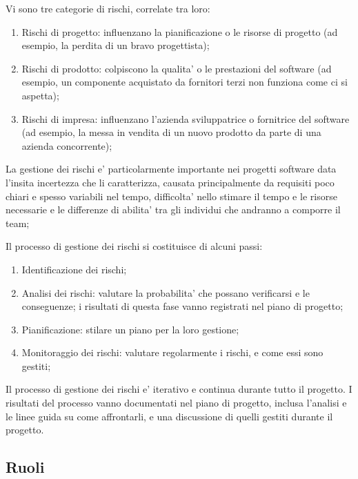 Vi sono tre categorie di rischi, correlate tra loro:

\begin{enumerate}
  \item Rischi di progetto: influenzano la pianificazione o le risorse di
    progetto (ad esempio, la perdita di un bravo progettista);
  \item Rischi di prodotto: colpiscono la qualita' o le prestazioni del software
    (ad esempio, un componente acquistato da fornitori terzi non funziona come
    ci si aspetta);
  \item Rischi di impresa: influenzano l'azienda sviluppatrice o fornitrice del
    software (ad esempio, la messa in vendita di un nuovo prodotto da parte
    di una azienda concorrente);
\end{enumerate}

La gestione dei rischi e' particolarmente importante nei progetti software data
l'insita incertezza che li caratterizza, causata principalmente da requisiti
poco chiari e spesso variabili nel tempo, difficolta' nello stimare il tempo e
le risorse necessarie e le differenze di abilita' tra gli individui che andranno
a comporre il team;

Il processo di gestione dei rischi si costituisce di alcuni passi:

\begin{enumerate}
  \item Identificazione dei rischi;
  \item Analisi dei rischi: valutare la probabilita' che possano verificarsi e
    le conseguenze; i risultati di questa fase vanno registrati nel piano di
    progetto;
  \item Pianificazione: stilare un piano per la loro gestione;
  \item Monitoraggio dei rischi: valutare regolarmente i rischi, e come essi
    sono gestiti;
\end{enumerate}

Il processo di gestione dei rischi e' iterativo e continua durante tutto il
progetto. I risultati del processo vanno documentati nel piano di progetto,
inclusa l'analisi e le linee guida su come affrontarli, e una discussione di
quelli gestiti durante il progetto.

\subsection{Ruoli}


